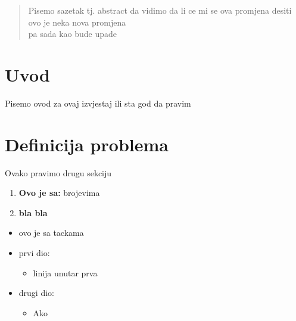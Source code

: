 \documentclass[10pt]{article}
\begin{document}
\newpage

\begin{abstract}

\noindent Pisemo sazetak tj. abstract da vidimo da li ce mi se ova promjena desiti \\
\noindent ovo je neka nova promjena  \\
\noindent pa sada kao bude upade 

\end{abstract}


\newpage

\tableofcontents

\newpage

\listoffigures





\newpage
\pagestyle{tptp_stil}

\section{Uvod}
\noindent Pisemo ovod za ovaj izvjestaj ili sta god da pravim


\section{Definicija problema}
\noindent Ovako pravimo drugu sekciju 


\begin{enumerate}
    \item \textbf{Ovo je sa: } brojevima 
    
    \item \textbf{bla bla} 
\end{enumerate}

    	\begin{itemize}
    		\item  ovo je sa tackama
		\end{itemize}
		

\begin{itemize}


    \itemsep0em %
    \item prvi dio:
    
		\begin{itemize}
    		\item linija unutar prva 

		\end{itemize}    
    
    	
    \item drugi dio:
    
		\begin{itemize}
    		\item Ako
		\end{itemize}      
    
    

\end{itemize}
\end{document}
